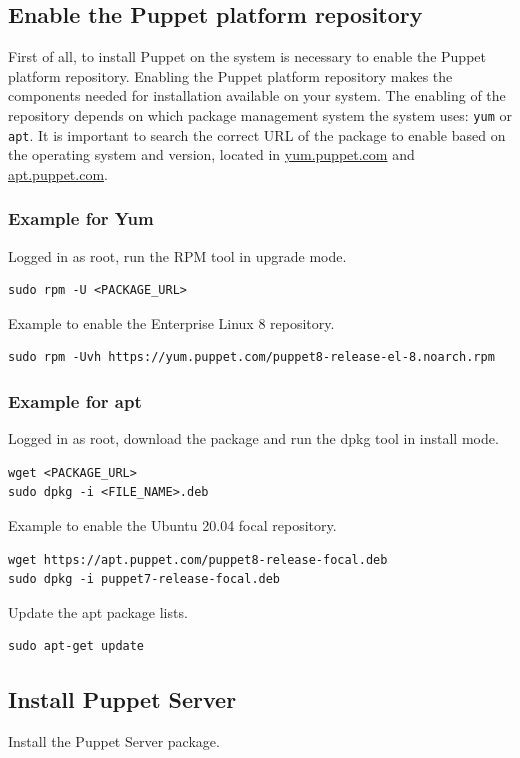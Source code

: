 \documentclass[12pt,a4paper,openright,twoside]{book}
\begin{document}
\subsection{Enable the Puppet platform repository}
First of all, to install Puppet on the system is necessary to enable the Puppet platform repository.
Enabling the Puppet platform repository makes the components needed for installation available on your system.
The enabling of the repository depends on which package management system the system uses: \texttt{yum} or \texttt{apt}.
It is important to search the correct URL of the package to enable based on the operating system and version, located in \url{yum.puppet.com} and \url{apt.puppet.com}.
\cite{puppetDocInstall}

\subsubsection{Example for Yum}
Logged in as root, run the RPM tool in upgrade mode.
\begin{lstlisting}
sudo rpm -U <PACKAGE_URL>
\end{lstlisting}

Example to enable the Enterprise Linux 8 repository. 
\begin{lstlisting}
sudo rpm -Uvh https://yum.puppet.com/puppet8-release-el-8.noarch.rpm
\end{lstlisting}

\subsubsection{Example for apt}
Logged in as root, download the package and run the dpkg tool in install mode.
\begin{lstlisting}
wget <PACKAGE_URL>
sudo dpkg -i <FILE_NAME>.deb
\end{lstlisting}

Example to enable the Ubuntu 20.04 focal repository.
\begin{lstlisting}
wget https://apt.puppet.com/puppet8-release-focal.deb
sudo dpkg -i puppet7-release-focal.deb
\end{lstlisting}

Update the apt package lists.
\begin{lstlisting}
sudo apt-get update
\end{lstlisting}

\cite{puppetDocInstall}

\subsection{Install Puppet Server}
Install the Puppet Server package.
\end{document}
